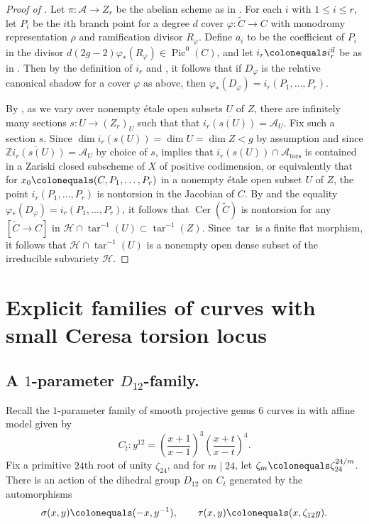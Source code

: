 \documentclass[reqno,10pt]{amsart}
\theoremstyle{definition}
\theoremstyle{definition}
\def\Z{{\mathbb Z}}
\DeclareMathOperator{\Pic}{Pic}
\DeclareMathOperator{\tar}{tar}
\DeclareMathOperator{\tors}{tors}
\newcommand{\Cer}{\operatorname{Cer}}
\begin{document}
\begin{proof}[Proof of ]
Let $\pi \colon \mathcal{A} \rightarrow Z_r$ be the abelian scheme  as in . 
For each $i$ with $1 \leq i \leq r$, let $P_i$ be the $i$th branch point for a degree $d$ cover  $\varphi \colon \widetilde{C} \rightarrow C$ with monodromy representation $\rho$ and ramification divisor $R_{\varphi}$. Define $a_i$ to be the coefficient of $P_i$ in the divisor $d(2g-2)\varphi_*(R_{\varphi}) \in \Pic^0(C)$, and let $i_r \colonequals i_r^{\vec{a}}$ be as in . Then by the definition of $i_r$ and , it follows that if $D_{\varphi}$ is the relative canonical shadow for a cover $\varphi$ as above, then $\varphi_*(D_{\varphi}) = i_r(P_1,\ldots,P_r)$.

By , as we vary over nonempty \'{e}tale open subsets $U$ of $Z$, there are infinitely many sections $s \colon U \rightarrow (Z_r)_U$ such that  that $\overline{i_r(s(U))} = \mathcal{A}_U$. Fix such a section $s$. Since $\dim i_r(s(U)) = \dim U = \dim Z< g$ by assumption and since $\overline{\Z i_r(s(U))} = \mathcal{A}_U$ by choice of $s$,  implies that $i_r(s(U)) \cap \mathcal{A}_{\tors}$ is contained in a Zariski closed subscheme of $X$ of positive codimension, or equivalently that for $x_0 \colonequals (C,P_1,\ldots,P_r)$ in a nonempty \'{e}tale open subset $U$ of $Z$, the point $i_r(P_1,\ldots,P_r)$ is nontorsion in the Jacobian of $C$. By  and the equality $\varphi_*(D_{\varphi}) = i_r(P_1,\ldots,P_r)$, it follows that $\Cer(\widetilde{C})$ is nontorsion for any $[\widetilde{C} \rightarrow C]$ in $\mathcal{H} \cap \tar^{-1}(U) \subset \tar^{-1}(Z)$. Since $\tar$ is a finite flat morphism, it follows that  $\mathcal{H} \cap \tar^{-1}(U)$ is a nonempty open dense  subset of the irreducible subvariety $\mathcal{H}$. 
\end{proof}

\section{Explicit families of curves with small Ceresa torsion locus}\label{sec:one-parameter}


\subsection{A $1$-parameter $D_{12}$-family.}

Recall the $1$-parameter family of smooth projective  genus $6$ curves in 
with affine model given by
\[ C_t: y^{12} = \left(\frac{x + 1}{x - 1} \right)^3 \left(\frac{x + t}{x - t} \right)^4.\] 
Fix a primitive $24$th root of unity $\zeta_{24}$, and for $m \mid 24$, let $\zeta_m \colonequals \zeta_{24}^{24/m}$. There is an action of the dihedral group $D_{12}$ on $C_t$ generated by the automorphisms 
\[ \sigma(x,y) \colonequals (- x, y^{- 1}), \quad \quad \tau(x, y) \colonequals (x, \zeta_{12}y).\] 
\end{document}
